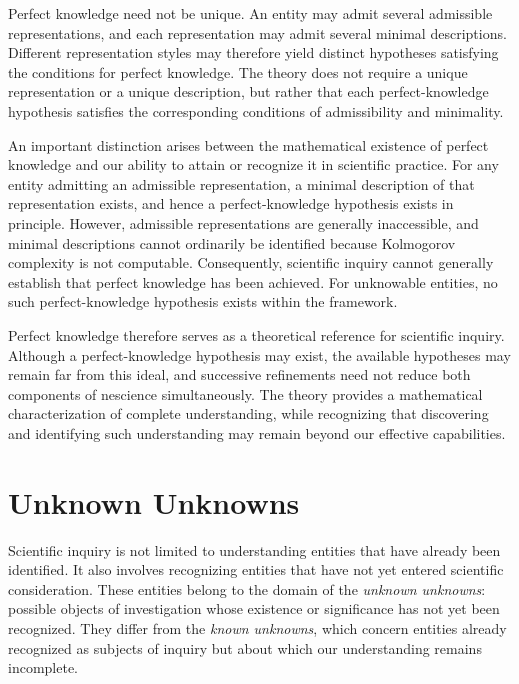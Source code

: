 Perfect knowledge need not be unique. An entity may admit several admissible representations, and each representation may admit several minimal descriptions. Different representation styles may therefore yield distinct hypotheses satisfying the conditions for perfect knowledge. The theory does not require a unique representation or a unique description, but rather that each perfect-knowledge hypothesis satisfies the corresponding conditions of admissibility and minimality.

An important distinction arises between the mathematical existence of perfect knowledge and our ability to attain or recognize it in scientific practice. For any entity admitting an admissible representation, a minimal description of that representation exists, and hence a perfect-knowledge hypothesis exists in principle. However, admissible representations are generally inaccessible, and minimal descriptions cannot ordinarily be identified because Kolmogorov complexity is not computable. Consequently, scientific inquiry cannot generally establish that perfect knowledge has been achieved. For unknowable entities, no such perfect-knowledge hypothesis exists within the framework.

Perfect knowledge therefore serves as a theoretical reference for scientific inquiry. Although a perfect-knowledge hypothesis may exist, the available hypotheses may remain far from this ideal, and successive refinements need not reduce both components of nescience simultaneously. The theory provides a mathematical characterization of complete understanding, while recognizing that discovering and identifying such understanding may remain beyond our effective capabilities.

%
%

\section{Unknown Unknowns}
\label{sec:intro_unknown_unknown}

Scientific inquiry is not limited to understanding entities that have already been identified. It also involves recognizing entities that have not yet entered scientific consideration. These entities belong to the domain of the \emph{unknown unknowns}: possible objects of investigation whose existence or significance has not yet been recognized. They differ from the \emph{known unknowns}, which concern entities already recognized as subjects of inquiry but about which our understanding remains incomplete.

